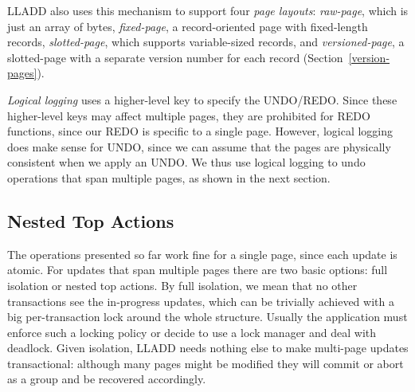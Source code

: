\documentclass[10pt,letterpaper,twocolumn,english]{article}
\newcommand{\yad}{LLADD\xspace}
\begin{document}
\yad also uses this mechanism to support four {\em page layouts}: 
{\em raw-page}, which is just an array of
bytes, {\em fixed-page}, a record-oriented page with fixed-length records,
{\em slotted-page}, which supports variable-sized records, and 
{\em versioned-page},  a slotted-page with a separate version number for 
each record (Section~\ref{version-pages}).  

{\em Logical logging} uses a higher-level key to specify the
UNDO/REDO.  Since these higher-level keys may affect multiple pages,
they are prohibited for REDO functions, since our REDO is specific to
a single page.  However, logical logging does make sense for UNDO,
since we can assume that the pages are physically consistent when we
apply an UNDO.  We thus use logical logging to undo operations that
span multiple pages, as shown in the next section.




\subsection{Nested Top Actions}
\label{nested-top-actions}

The operations presented so far work fine for a single page, since
each update is atomic.  For updates that span multiple pages there 
are two basic options: full isolation or nested top actions.
By full isolation, we mean that no other transactions see the
in-progress updates, which can be trivially achieved with a big per-transaction lock
around the whole structure.  Usually the application must enforce 
such a locking policy or decide to use a lock manager and deal with 
deadlock.  Given isolation, \yad needs nothing else to
make multi-page updates transactional: although many pages might be
modified they will commit or abort as a group and be recovered
accordingly.
\end{document}
